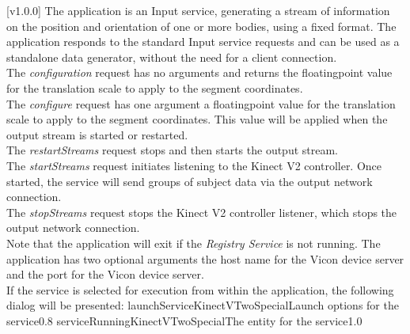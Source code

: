 [v1.0.0]
The  application is an Input service,
generating a stream of information on the position and orientation of one or more bodies,
using a fixed format.
The application responds to the standard Input service requests and can be used as a
standalone data generator, without the need for a client connection.\\

The \emph{configuration} request has no arguments and returns the floating\longDash{}point
value for the translation scale to apply to the segment coordinates.\\

The \emph{configure} request has one argument \longDash{} a floating\longDash{}point
value for the translation scale to apply to the segment coordinates.
This value will be applied when the output stream is started or restarted.\\ 

The \emph{restartStreams} request stops and then starts the output stream.\\

The \emph{startStreams} request initiates listening to the Kinect V2 controller.
Once started, the service will send groups of subject data via the output \yarp{} network
connection.\\

The \emph{stopStreams} request stops the Kinect V2 controller listener, which stops the
output \yarp{} network connection.\\ 

Note that the application will exit if the \emph{Registry Service} is not running.
The application has two optional arguments \longDash{} the host name for the Vicon device
server and the port for the Vicon device server.
\insertAppParameters
\condPage
\insertTagDescription{\KVtwoSI}
\insertInputServiceComment\\

\insertStandardServiceCommands
\secondaryEnd
{}
If the service is selected for execution from within the \emph{\MMMU} application, the
following dialog will be presented:
%
{launchServiceKinectVTwoSpecial}{Launch options for the \KVtwoSI{} service}{0.8}
\condPage
{}%
{serviceRunningKinectVTwoSpecial}{The \emph{\MMMU} entity for the \KVtwoSI{} service}{1.0}
\secondaryEnd
\primaryEnd{}
